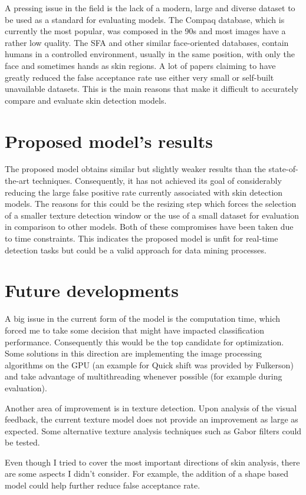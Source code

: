\documentclass[12pt]{report}
\begin{document}
	A pressing issue in the field is the lack of a modern, large and diverse dataset to be used as a standard for evaluating models. The Compaq database, which is currently the most popular, was composed in the 90s and most images have a rather low quality. The SFA and other similar face-oriented databases, contain humans in a controlled environment, usually in the same position, with only the face and sometimes hands as skin regions. A lot of papers claiming to have greatly reduced the false acceptance rate use either very small or self-built unavailable datasets. This is the main reasons that make it difficult to accurately compare and evaluate skin detection models.
	
	\section{Proposed model's results}
	
	The proposed model obtains similar but slightly weaker results than the state-of-the-art techniques. Consequently, it has not achieved its goal of considerably reducing the large false positive rate currently associated with skin detection models. The reasons for this could be the resizing step which forces the selection of a smaller texture detection window or the use of a small dataset for evaluation in comparison to other models. Both of these compromises have been taken due to time constraints. This indicates the proposed model is unfit for real-time detection tasks but could be a valid approach for data mining processes.
	
	\section{Future developments}
	A big issue in the current form of the model is the computation time, which forced me to take some decision that might have impacted classification performance. Consequently this would be the top candidate for optimization. Some solutions in this direction are implementing the image processing algorithms on the GPU (an example for Quick shift was provided by Fulkerson\cite{quickshift_gpu}) and take advantage of multithreading whenever possible (for example during evaluation).
	
	Another area of improvement is in texture detection. Upon analysis of the visual feedback, the current texture model does not provide an improvement as large as expected. Some alternative texture analysis techniques such as Gabor filters could be tested.
	
	Even though I tried to cover the most important directions of skin analysis, there are some aspects I didn't consider. For example, the addition of a shape based model could help further reduce false acceptance rate.
	
	\newpage
	
	
\end{document}
